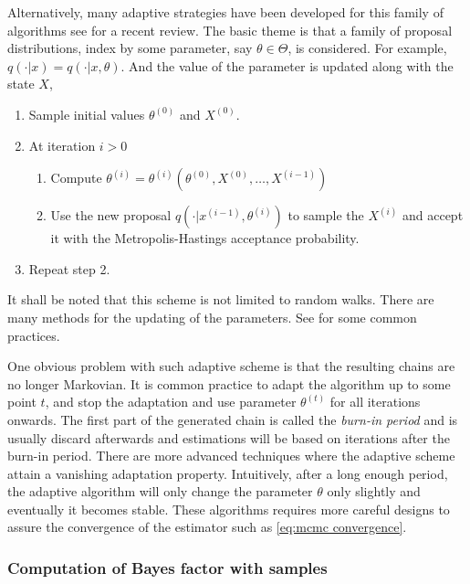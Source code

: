 Alternatively, many adaptive strategies have been developed for this family of
algorithms see \cite{Andrieu:2008kh} for a recent review. The basic theme is
that a family of proposal distributions, index by some parameter, say
$\theta\in\Theta$, is considered. For example, $q(\cdot|x) = q(\cdot|x,
\theta)$. And the value of the parameter is updated along with the state $X$,
\begin{enumerate}
  \item Sample initial values $\theta^{(0)}$ and $X^{(0)}$.
  \item At iteration $i > 0$
    \begin{enumerate}
      \item Compute $\theta^{(i)} =
        \theta^{(i)}(\theta^{(0)},X^{(0)},\dots,X^{(i-1)})$
      \item Use the new proposal $q(\cdot|x^{(i-1)},\theta^{(i)})$ to sample
        the $X^{(i)}$ and accept it with the Metropolis-Hastings acceptance
        probability.
    \end{enumerate}
  \item Repeat step 2.
\end{enumerate}
It shall be noted that this scheme is not limited to random walks. There are
many methods for the updating of the parameters. See \cite{Andrieu:2008kh} for
some common practices.

One obvious problem with such adaptive scheme is that the resulting chains are
no longer Markovian. It is common practice to adapt the algorithm up to some
point $t$, and stop the adaptation and use parameter $\theta^{(t)}$ for all
iterations onwards. The first part of the generated chain is called the
\emph{burn-in period} and is usually discard afterwards and estimations will
be based on iterations after the burn-in period. There are more advanced
techniques where the adaptive scheme attain a vanishing adaptation property.
Intuitively, after a long enough period, the adaptive algorithm will only
change the parameter $\theta$ only slightly and eventually it becomes stable.
These algorithms requires more careful designs to assure the convergence of
the estimator such as \eqref{eq:mcmc convergence}.

\subsubsection{Computation of Bayes factor with \protect\mcmc samples}
\label{ssub:Computation of Bayes factor with mcmc samples}


